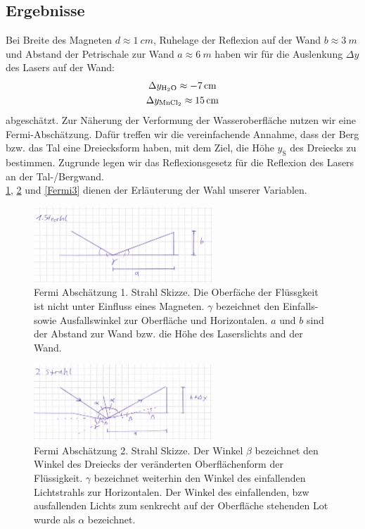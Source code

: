 \documentclass[
	a4paper,
	12pt,
	pagesize,
	ngerman
]{scrartcl}
\begin{document}
	\subsection{Ergebnisse}
	Bei Breite des Magneten $d \approx \SI{1}{cm}$, Ruhelage der Reflexion auf der Wand $b \approx \SI{3}{m}$ und Abstand der Petrischale zur Wand $a \approx \SI{6}{m}$ haben wir für die Auslenkung $\Delta y$ des Lasers auf der Wand: \newline
	\begin{gather*} 
		\Delta y_\text{\ce{H2O}} \approx \SI{-7}{cm} \\
		\Delta y_\text{\ce{MnCl2}} \approx \SI{15}{cm}
	\end{gather*}
	abgeschätzt.
	Zur Näherung der Verformung der Wasseroberfläche nutzen wir eine Fermi-Abschätzung. Dafür treffen wir die vereinfachende Annahme, dass der Berg bzw. das Tal eine Dreiecksform haben, mit dem Ziel, die Höhe $y_\text{S}$ des Dreiecks zu bestimmen. Zugrunde legen wir das Reflexionsgesetz für die Reflexion des Lasers an der Tal-/Bergwand.\\
	\cref{Fermi1}, \cref{Fermi2} und \cref{Fermi3} dienen der Erläuterung der Wahl unserer Variablen.
	\begin{figure}[htb]
	  \centering
	    \includegraphics[width=0.6\textwidth]{Fermi1} 
		\caption[Fermi Abschätzung 1. Strahl Skizze]{Fermi Abschätzung 1. Strahl Skizze. Die Oberfäche der Flüssgkeit ist nicht unter Einfluss eines Magneten. $\gamma$ bezeichnet den Einfalls- sowie Ausfallswinkel zur Oberfläche und Horizontalen. $a$ und $b$ sind der Abstand zur Wand bzw. die Höhe des Laserslichts and der Wand.}

		\label{Fermi1}
	\end{figure}
	\begin{figure}[htb]
	  \centering
	    \includegraphics[width=0.6\textwidth]{Fermi2} 
		\caption[Fermi Abschätzung 2. Strahl Skizze]{Fermi Abschätzung 2. Strahl Skizze. Der Winkel $\beta$ bezeichnet den Winkel des Dreiecks der veränderten Oberflächenform der Flüssigkeit. $\gamma$ bezeichnet weiterhin den Winkel des einfallenden Lichtstrahls zur Horizontalen. Der Winkel des einfallenden, bzw ausfallenden Lichts zum senkrecht auf der Oberfläche stehenden Lot wurde als $\alpha$ bezeichnet.}
		\label{Fermi2}
	\end{figure}
\end{document}
